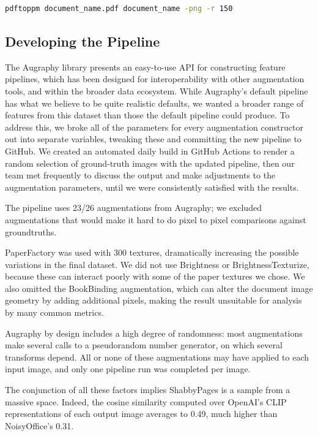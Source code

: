 \documentclass[runningheads]{llncs}
\begin{document}
\begin{lstlisting}[language=bash]
  pdftoppm document_name.pdf document_name -png -r 150
\end{lstlisting}

\subsection{Developing the Pipeline}
The Augraphy library presents an easy-to-use API for constructing feature pipelines, which has been designed for interoperability with other augmentation tools, and within the broader data ecosystem.
While Augraphy's default pipeline has what we believe to be quite realistic defaults, we wanted a broader range of features from this dataset than those the default pipeline could produce.
To address this, we broke all of the parameters for every augmentation constructor out into separate variables, tweaking these and committing the new pipeline to GitHub.
We created an automated daily build in GitHub Actions to render a random selection of ground-truth images with the updated pipeline, then our team met frequently to discuss the output and make adjustments to the augmentation parameters, until we were consistently satisfied with the results.

The pipeline uses 23/26 augmentations from Augraphy; we excluded augmentations that would make it hard to do pixel to pixel comparisons against groundtruths.

PaperFactory was used with 300 textures, dramatically increasing the possible variations in the final dataset. We did not use Brightness or BrightnessTexturize, because these can interact poorly with some of the paper textures we chose. We also omitted the BookBinding augmentation, which can alter the document image geometry by adding additional pixels, making the result unsuitable for analysis by many common metrics.

Augraphy by design includes a high degree of randomness: most augmentations make several calls to a pseudorandom number generator, on which several transforms depend.
All or none of these augmentations may have applied to each input image, and only one pipeline run was completed per image.

The conjunction of all these factors implies ShabbyPages is a sample from a massive space.
Indeed, the cosine similarity computed over OpenAI's CLIP representations of each output image averages to 0.49, much higher than NoisyOffice's 0.31.
\end{document}
